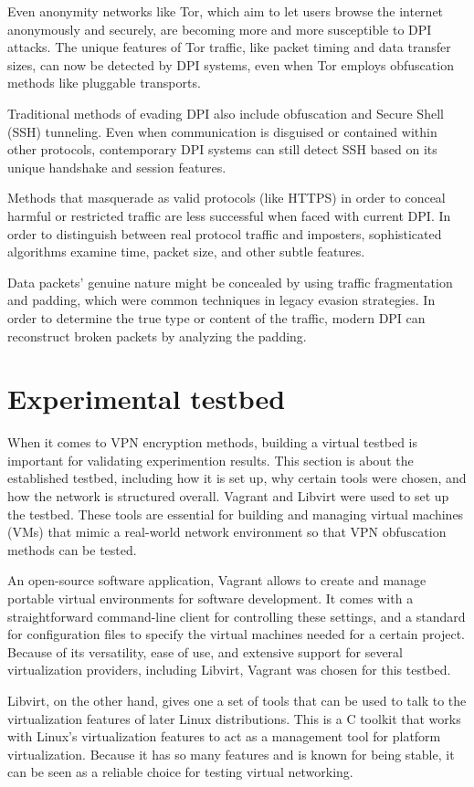\documentclass[12pt, fleqn, a4paper]{article}
\begin{document}
Even anonymity networks like Tor, which aim to let users browse the internet anonymously and securely, are becoming more and more susceptible to DPI attacks. The unique features of Tor traffic, like packet timing and data transfer sizes, can now be detected by DPI systems, even when Tor employs obfuscation methods like pluggable transports.

Traditional methods of evading DPI also include obfuscation and Secure Shell (SSH) tunneling. Even when communication is disguised or contained within other protocols, contemporary DPI systems can still detect SSH based on its unique handshake and session features. \citep{sshtunneling}

Methods that masquerade as valid protocols (like HTTPS) in order to conceal harmful or restricted traffic are less successful when faced with current DPI. In order to distinguish between real protocol traffic and imposters, sophisticated algorithms examine time, packet size, and other subtle features. \citep{dpisslinspect}

Data packets' genuine nature might be concealed by using traffic fragmentation and padding, which were common techniques in legacy evasion strategies. In order to determine the true type or content of the traffic, modern DPI can reconstruct broken packets by analyzing the padding.
\section{Experimental testbed}
When it comes to VPN encryption methods, building a virtual testbed is important for validating experimention results. This section is about the established testbed, including how it is set up, why certain tools were chosen, and how the network is structured overall. Vagrant and Libvirt were used to set up the testbed. These tools are essential for building and managing virtual machines (VMs) that mimic a real-world network environment so that VPN obfuscation methods can be tested.

An open-source software application, Vagrant allows to create and manage portable virtual environments for software development. It comes with a straightforward command-line client for controlling these settings, and a standard for configuration files to specify the virtual machines needed for a certain project. Because of its versatility, ease of use, and extensive support for several virtualization providers, including Libvirt, Vagrant was chosen for this testbed.

Libvirt, on the other hand, gives one a set of tools that can be used to talk to the virtualization features of later Linux distributions. This is a C toolkit that works with Linux's virtualization features to act as a management tool for platform virtualization. Because it has so many features and is known for being stable, it can be seen as a reliable choice for testing virtual networking.
\end{document}
